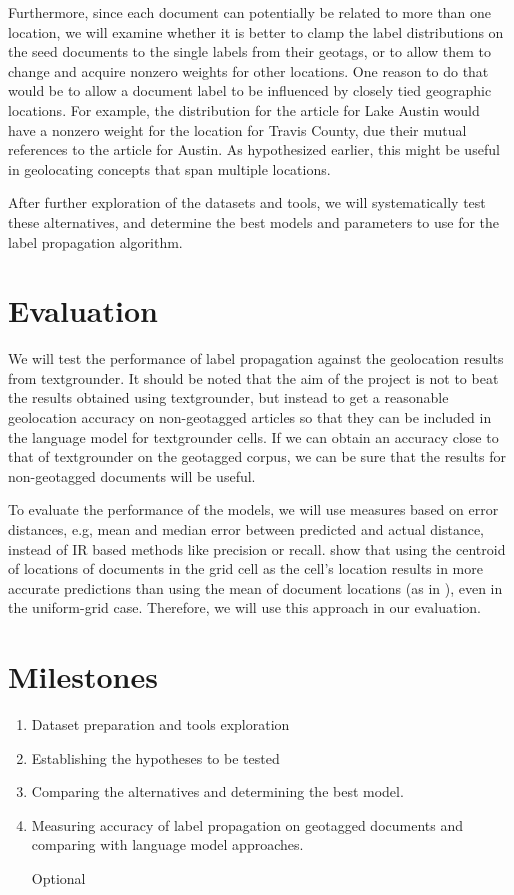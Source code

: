 \documentclass[11pt]{article}
\newcommand{\comment}[1]{}
\begin{document}
Furthermore, since each document can potentially be related to more than one location, we will examine whether it is better to clamp the label distributions 
on the seed documents to the single labels from their geotags, or to allow them to change and acquire nonzero weights for other locations.
One reason to do that would be to allow a document label to be influenced by closely tied geographic locations. For example, the distribution for the article for 
Lake Austin would have a nonzero weight for the location for Travis County, due their mutual references to the article for Austin. As hypothesized earlier, this
might be useful in geolocating concepts that span multiple locations.

After further exploration of the datasets and tools, we will systematically test these alternatives, and determine the best models and parameters to use 
for the label propagation algorithm.


\section{Evaluation}
We will test the performance of label propagation against the geolocation results from textgrounder. 
It should be noted that the aim of the project is not to beat the results obtained using textgrounder,
but instead to get a reasonable geolocation accuracy on non-geotagged articles 
so that they can be included in the language model for textgrounder cells. 
If we can obtain an accuracy close to that of textgrounder on the geotagged corpus, 
we can be sure that the results for non-geotagged documents will be useful.

To evaluate the performance of the models, we will use measures based on error distances, e.g, mean and median error between predicted and actual distance,  
instead of IR based methods like precision or recall. \cite{rolleretal:12} show that using the centroid of locations of documents in the grid cell as the cell's location 
results in more accurate predictions than using the mean of document locations (as in \cite{wing-baldridge:11}), even in the uniform-grid case. Therefore, we will
use this approach in our evaluation.

\comment{I suggest we remove the next two sections: we're already running over the page limit! -Aidan}

\section{Milestones}
\begin{enumerate}
    \item Dataset preparation and tools exploration
    \item Establishing the hypotheses to be tested
    \item Comparing the alternatives and determining the best model.
    \item Measuring accuracy of label propagation on geotagged documents and comparing with language model approaches.
    \item  [Optional] 
\end{enumerate}
\end{document}
